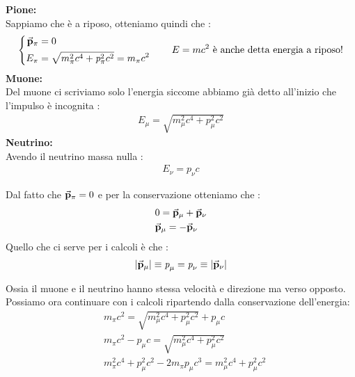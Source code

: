 \textbf{Pione:} \\
Sappiamo che è a riposo, otteniamo quindi che : 
\begin{equation*}
        \left\{ \begin{aligned}
                        \va{p}_{\pi} &= 0 \\
                        E_{\pi} &= \sqrt{m^2_{\pi}c^4 + \textit{p}_{\pi}^2c^2} = m_{\pi}c^2 
                \end{aligned}
                \right.
                \qquad \text{$E=mc^2$ è anche detta energia a riposo!}
\end{equation*}
\textbf{Muone:}\\
Del muone ci scriviamo solo l'energia siccome abbiamo già detto all'inizio che l'impulso è incognita : 
\begin{align*}
    E_{\mu} = \sqrt{m_{\mu}^2c^4 + \textit{p}_{\mu}^2c^2}
\end{align*}
\textbf{Neutrino:}\\
Avendo il neutrino massa nulla : 
\begin{align*}
    E_{\nu} = \textit{p}_{\nu}c
\end{align*}
\begin{tcolorbox}[colback=red!5!white,colframe=red!50!black,title=ATTENZIONE !]
        Dal fatto che $\va{p}_{\pi} = 0$ e per la conservazione otteniamo che : 
        \begin{align*}
                &0 = \va{p}_{\mu} + \va{p}_{\nu} \\
                &\va{p}_{\mu} = -\va{p}_{\nu} 
        \end{align*}
        Quello che ci serve per i calcoli è che : 
        \begin{align*}
            \abs{\va{p}_{\mu}} \equiv \textit{p}_{\mu} = \textit{p}_{\nu} \equiv \abs{\va{p}_{\nu}}
        \end{align*}
\end{tcolorbox}
Ossia il muone e il neutrino hanno stessa velocità e direzione ma verso opposto. \\
Possiamo ora continuare con i calcoli ripartendo dalla conservazione dell'energia: 
\begin{align*}
        &m_{\pi}c^2 = \sqrt{m_{\mu}^2c^4 + \textit{p}_{\mu}^2c^2} + \textit{p}_{\mu}c\\
        &m_{\pi}c^2 - \textit{p}_{\mu}c =\sqrt{m_{\mu}^2c^4 +\textit{p}_{\mu}^2c^2 }\\ 
        &m_{\pi}^2c^4 + \textit{p}_{\mu}^2c^2 - 2m_{\pi}\textit{p}_{\mu}c^3 = m_{\mu}^2c^4 +\textit{p}_{\mu}^2c^2
\end{align*}
